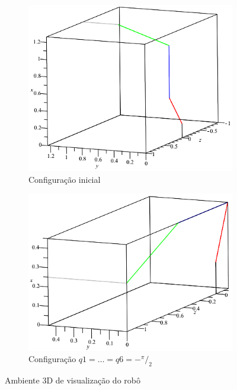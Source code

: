 \begin{figure}[h]
    \centering
    \begin{subfigure}[b]{0.4\textwidth}
        \includegraphics[width=\textwidth]{figs/amb3D_posA}
        \caption{Configuração inicial}
        \label{fig::amb3D_posA}
    \end{subfigure}
    \quad %
    \begin{subfigure}[b]{0.45\textwidth}
        \includegraphics[width=\textwidth]{figs/amb3D_posB}
        \caption{Configuração $q1 = \ldots = q6 = {-}^{\pi}/_2$}
        \label{fig::amb3D_posB}
    \end{subfigure}
    \caption{Ambiente 3D de visualização do robô}\label{fig::amb3D}
\end{figure}

